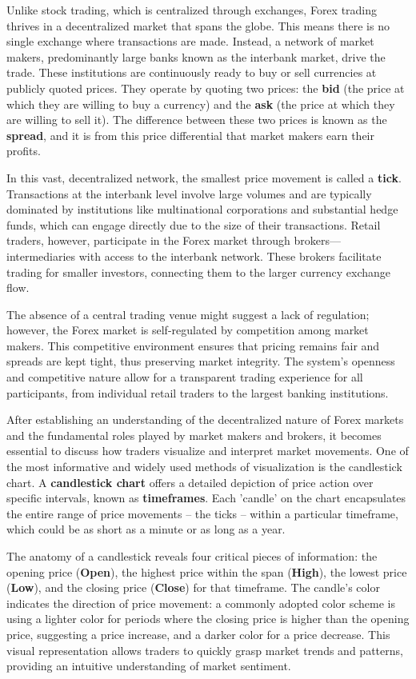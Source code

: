 Unlike stock trading, which is centralized through exchanges, Forex trading thrives in a decentralized market that spans the globe. This means there is no single exchange where transactions are made. Instead, a network of market makers, predominantly large banks known as the interbank market, drive the trade. These institutions are continuously ready to buy or sell currencies at publicly quoted prices. They operate by quoting two prices: the \textbf{bid} (the price at which they are willing to buy a currency) and the \textbf{ask} (the price at which they are willing to sell it). The difference between these two prices is known as the \textbf{spread}, and it is from this price differential that market makers earn their profits.

In this vast, decentralized network, the smallest price movement is called a \textbf{tick}. Transactions at the interbank level involve large volumes and are typically dominated by institutions like multinational corporations and substantial hedge funds, which can engage directly due to the size of their transactions. Retail traders, however, participate in the Forex market through brokers—intermediaries with access to the interbank network. These brokers facilitate trading for smaller investors, connecting them to the larger currency exchange flow.

The absence of a central trading venue might suggest a lack of regulation; however, the Forex market is self-regulated by competition among market makers. This competitive environment ensures that pricing remains fair and spreads are kept tight, thus preserving market integrity. The system's openness and competitive nature allow for a transparent trading experience for all participants, from individual retail traders to the largest banking institutions.

After establishing an understanding of the decentralized nature of Forex markets and the fundamental roles played by market makers and brokers, it becomes essential to discuss how traders visualize and interpret market movements. One of the most informative and widely used methods of visualization is the candlestick chart. A \textbf{candlestick chart} offers a detailed depiction of price action over specific intervals, known as \textbf{timeframes}. Each 'candle' on the chart encapsulates the entire range of price movements – the ticks – within a particular timeframe, which could be as short as a minute or as long as a year.

The anatomy of a candlestick reveals four critical pieces of information: the opening price (\textbf{Open}), the highest price within the span (\textbf{High}), the lowest price (\textbf{Low}), and the closing price (\textbf{Close}) for that timeframe. The candle's color indicates the direction of price movement: a commonly adopted color scheme is using a lighter color for periods where the closing price is higher than the opening price, suggesting a price increase, and a darker color for a price decrease. This visual representation allows traders to quickly grasp market trends and patterns, providing an intuitive understanding of market sentiment.

